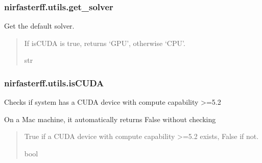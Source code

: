 \documentclass[letterpaper,10pt,english]{sphinxmanual}
\begin{document}
\sphinxstepscope


\subsubsection{nirfasterff.utils.get\_solver}
\label{\detokenize{_autosummary/nirfasterff.utils.get_solver:nirfasterff-utils-get-solver}}\label{\detokenize{_autosummary/nirfasterff.utils.get_solver::doc}}

\begin{fulllineitems}
\label{\detokenize{_autosummary/nirfasterff.utils.get_solver:nirfasterff.utils.get_solver}}
\pysigstartsignatures
\pysiglinewithargsret
{}
{}
{}
\pysigstopsignatures
\sphinxAtStartPar
Get the default solver.
\begin{quote}\begin{description}
\sphinxAtStartPar
If isCUDA is true, returns ‘GPU’, otherwise ‘CPU’.

\sphinxAtStartPar
str

\end{description}\end{quote}

\end{fulllineitems}


\sphinxstepscope


\subsubsection{nirfasterff.utils.isCUDA}
\label{\detokenize{_autosummary/nirfasterff.utils.isCUDA:nirfasterff-utils-iscuda}}\label{\detokenize{_autosummary/nirfasterff.utils.isCUDA::doc}}

\begin{fulllineitems}
\label{\detokenize{_autosummary/nirfasterff.utils.isCUDA:nirfasterff.utils.isCUDA}}
\pysigstartsignatures
\pysiglinewithargsret
{}
{}
{}
\pysigstopsignatures
\sphinxAtStartPar
Checks if system has a CUDA device with compute capability \textgreater{}=5.2

\sphinxAtStartPar
On a Mac machine, it automatically returns False without checking
\begin{quote}\begin{description}
\sphinxAtStartPar
True if a CUDA device with compute capability \textgreater{}=5.2 exists, False if not.

\sphinxAtStartPar
bool

\end{description}\end{quote}

\end{fulllineitems}
\end{document}
